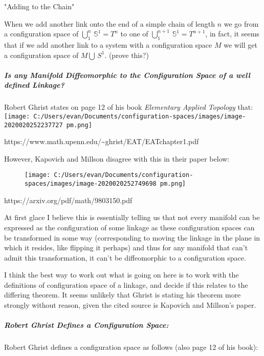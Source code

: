 \documentclass[
]{article}
\begin{document}
"Adding to the Chain"

When we add another link onto the end of a simple chain of length \(n\)
we go from a configuration space of \(\bigcup_1^n \, \mathbb S^1 = T^n\)
to one of \(\bigcup_1^{n+1} \, \mathbb S^1 = T^{n+1}\), in fact, it
seems that if we add another link to a system with a configuration space
\(M\) we will get a configuration space of \(M \bigcup \mathbb \, S^1\).
(prove this?)

\hypertarget{header-n103}{%
\subparagraph{\texorpdfstring{\emph{Is any Manifold Diffeomorphic to the
Configuration Space of a well defined
Linkage?}}{Is any Manifold Diffeomorphic to the Configuration Space of a well defined Linkage?}}\label{header-n103}}

Robert Ghrist states on page 12 of his book \emph{Elementary Applied
Topology} that:
\texttt{[image: C:/Users/evan/Documents/configuration-spaces/images/image-2020020252237727 pm.png]}

https://www.math.upenn.edu/\textasciitilde ghrist/EAT/EATchapter1.pdf

However, Kapovich and Millson disagree with this in their paper below:

\begin{figure}
\centering
\texttt{[image: C:/Users/evan/Documents/configuration-spaces/images/image-2020020252749698 pm.png]}
\caption{}
\end{figure}

https://arxiv.org/pdf/math/9803150.pdf

At first glace I believe this is essentially telling us that not every
manifold can be expressed as the configuration of some linkage as these
configuration spaces can be transformed in some way (corresponding to
moving the linkage in the plane in which it resides, like flipping it
perhaps) and thus for any manifold that can't admit this transformation,
it can't be diffeomorphic to a configuration space.

I think the best way to work out what is going on here is to work with
the definitions of configuration space of a linkage, and decide if this
relates to the differing theorem. It seems unlikely that Ghrist is
stating his theorem more strongly without reason, given the cited source
is Kapovich and Millson's paper.

\hypertarget{header-n111}{%
\subparagraph{\texorpdfstring{\emph{Robert Ghrist Defines a
Configuration
Space:}}{Robert Ghrist Defines a Configuration Space:}}\label{header-n111}}

Robert Ghrist defines a configuration space as follows (also page 12 of
his book):
\end{document}
